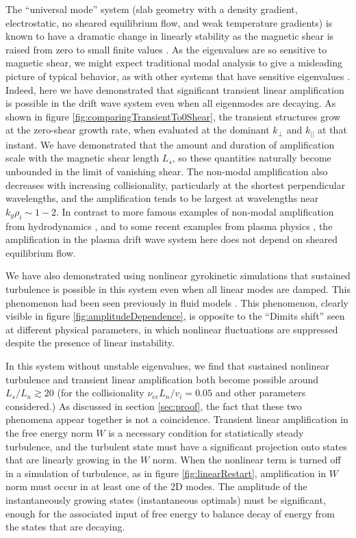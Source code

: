 \documentclass[12pt,superscriptaddress]{revtex4}
\newcommand{\nuee}{\nu_{ee}}
\begin{document}
The ``universal mode'' system (slab geometry with a density gradient, electrostatic,
no sheared equilibrium flow, and weak temperature gradients)
is known to have a dramatic change in linearly stability
as the magnetic shear is raised from zero to small finite values
\cite{Ross, Tsang, Antonsen,usUniversalInstability}.
As the eigenvalues are so sensitive to magnetic shear,
we might expect traditional modal analysis to
give a misleading picture of typical behavior,
as with other systems that have sensitive eigenvalues \cite{TrefethenEmbree}.
Indeed, here we have demonstrated that significant
transient linear amplification is possible in the drift wave system even when
all eigenmodes are decaying.
As shown in figure \ref{fig:comparingTransientTo0Shear},
the transient structures grow at the zero-shear
growth rate, when evaluated at the dominant $k_{\perp}$ and $k_{||}$ at that instant.
We have demonstrated that the amount and duration of amplification scale
with the magnetic shear length $L_s$, so these quantities naturally become
unbounded in the limit of vanishing shear.
The non-modal amplification also decreases with increasing collisionality,
particularly at the shortest perpendicular wavelengths,
and the amplification tends to be largest at wavelengths near $k_y \rho_i \sim 1-2$.
In contrast to more famous examples of non-modal amplification
from hydrodynamics \cite{TrefethenSubcritical}, and to some recent examples from plasma physics \cite{Newton, Alex, BarnesRotation, EdmundPRL},
the amplification in the plasma drift wave system here
does not depend on sheared equilibrium flow.

We have also demonstrated using nonlinear gyrokinetic simulations
that sustained turbulence is possible in this system
even when all linear modes are damped.
This phenomenon had been seen previously
in fluid models \cite{Scott1, Scott2, Drake}.
This phenomenon, clearly visible in figure \ref{fig:amplitudeDependence},
is opposite to the ``Dimits shift'' \cite{Dimits} seen at different physical parameters,
in which nonlinear fluctuations
are suppressed despite the presence of linear instability.

In this system without unstable eigenvalues, we find that sustained nonlinear turbulence
and transient linear amplification both become possible around $L_s / L_n \gtrsim 20$
(for the collisionality $\nuee L_n / v_i = 0.05$ and other parameters considered.)
As discussed in section \ref{sec:proof}, the fact that these two phenomena appear together is not
a coincidence. Transient linear amplification in the free energy norm $W$ is a necessary condition for statistically steady
turbulence, and the turbulent state must have a significant projection onto states that are linearly growing in the $W$
norm.  When the nonlinear term is turned off in a simulation of turbulence, as in figure \ref{fig:linearRestart},
amplification in $W$ norm must occur in at least one of the 2D modes.
The amplitude of the instantaneously growing states (instantaneous optimals) must be
significant, enough for the associated input of free energy to balance decay of energy
from the states that are decaying.
\end{document}
